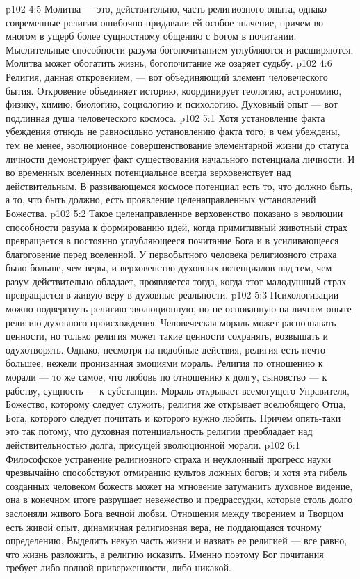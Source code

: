 \vs p102 4:5 \pc Молитва --- это, действительно, часть религиозного опыта, однако современные религии ошибочно придавали ей особое значение, причем во многом в ущерб более сущностному общению с Богом в почитании. Мыслительные способности разума богопочитанием углубляются и расширяются. Молитва может обогатить жизнь, богопочитание же озаряет судьбу.
\vs p102 4:6 \pc Религия, данная откровением, --- вот объединяющий элемент человеческого бытия. Откровение объединяет историю, координирует геологию, астрономию, физику, химию, биологию, социологию и психологию. Духовный опыт --- вот подлинная душа человеческого космоса.
\vs p102 5:1 Хотя установление факта убеждения отнюдь не равносильно установлению факта того, в чем убеждены, тем не менее, эволюционное совершенствование элементарной жизни до статуса личности демонстрирует факт существования начального потенциала личности. И во временных вселенных потенциальное всегда верховенствует над действительным. В развивающемся космосе потенциал есть то, что должно быть, а то, что быть должно, есть проявление целенаправленных установлений Божества.
\vs p102 5:2 Такое целенаправленное верховенство показано в эволюции способности разума к формированию идей, когда примитивный животный страх превращается в постоянно углубляющееся почитание Бога и в усиливающееся благоговение перед вселенной. У первобытного человека религиозного страха было больше, чем веры, и верховенство духовных потенциалов над тем, чем разум действительно обладает, проявляется тогда, когда этот малодушный страх превращается в живую веру в духовные реальности.
\vs p102 5:3 Психологизации можно подвергнуть религию эволюционную, но не основанную на личном опыте религию духовного происхождения. Человеческая мораль может распознавать ценности, но только религия может такие ценности сохранять, возвышать и одухотворять. Однако, несмотря на подобные действия, религия есть нечто большее, нежели пронизанная эмоциями мораль. Религия по отношению к морали --- то же самое, что любовь по отношению к долгу, сыновство --- к рабству, сущность --- к субстанции. Мораль открывает всемогущего Управителя, Божество, которому следует служить; религия же открывает вселюбящего Отца, Бога, которого следует почитать и которого нужно любить. Причем опять\hyp{}таки это так потому, что духовная потенциальность религии преобладает над действительностью долга, присущей эволюционной морали.
\vs p102 6:1 Философское устранение религиозного страха и неуклонный прогресс науки чрезвычайно способствуют отмиранию культов ложных богов; и хотя эта гибель созданных человеком божеств может на мгновение затуманить духовное видение, она в конечном итоге разрушает невежество и предрассудки, которые столь долго заслоняли живого Бога вечной любви. Отношения между творением и Творцом есть живой опыт, динамичная религиозная вера, не поддающаяся точному определению. Выделить некую часть жизни и назвать ее религией --- все равно, что жизнь разложить, а религию исказить. Именно поэтому Бог почитания требует либо полной приверженности, либо никакой.

